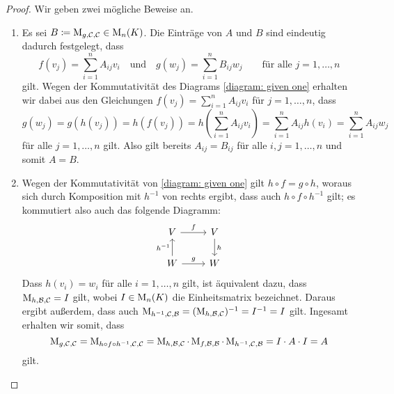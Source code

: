 \begin{proof}
  Wir geben zwei mögliche Beweise an.
  \begin{enumerate}
    \item
      Es sei $B \coloneqq \operatorname{M}_{g, \mathcal{C}, \mathcal{C}} \in \operatorname{M}_{n}(K)$.
      Die Einträge von $A$ und $B$ sind eindeutig dadurch festgelegt, dass
      \[
          f(v_j)
        = \sum_{i=1}^n A_{ij} v_i
        \quad\text{und}\quad
          g(w_j)
        = \sum_{i=1}^n B_{ij} w_j
        \qquad
        \text{für alle $j = 1, \dotsc, n$}
      \]
      gilt. Wegen der Kommutativität des Diagrams \eqref{diagram: given one} erhalten wir dabei aus den Gleichungen $f(v_j) = \sum_{i=1}^n A_{ij} v_i$ für $j = 1, \dotsc, n$, dass
      \[
          g( w_j )
        = g( h(v_j) )
        = h( f(v_j) )
        = h\left( \sum_{i=1}^n A_{ij} v_i \right)
        = \sum_{i=1}^n A_{ij} h(v_i)
        = \sum_{i=1}^n A_{ij} w_j
      \]
      für alle $j = 1, \dotsc, n$ gilt.
      Also gilt bereits $A_{ij} = B_{ij}$ für alle $i,j = 1, \dotsc, n$ und somit $A = B$.
    \item
      Wegen der Kommutativität von \eqref{diagram: given one} gilt $h \circ f = g \circ h$, woraus sich durch Komposition mit $h^{-1}$ von rechts ergibt, dass auch $h \circ f \circ h^{-1}$ gilt;
      es kommutiert also auch das folgende Diagramm:
      \begin{equation}
        \begin{tikzcd}
            V
            \arrow{r}{f}
          & V
            \arrow{d}{h}
          \\
            W
            \arrow{u}{h^{-1}}
            \arrow{r}{g}
          & W
        \end{tikzcd}
      \end{equation}
      Dass $h(v_i) = w_i$ für alle $i = 1, \dotsc, n$ gilt, ist äquivalent dazu, dass $\operatorname{M}_{h, \mathcal{B}, \mathcal{C}} = I$ gilt, wobei $I \in \operatorname{M}_{n}(K)$ die Einheitsmatrix bezeichnet.
      Daraus ergibt außerdem, dass auch $\operatorname{M}_{h^{-1}, \mathcal{C}, \mathcal{B}} = (\operatorname{M}_{h, \mathcal{B}, \mathcal{C}})^{-1} = I^{-1} = I$ gilt.
      Ingesamt erhalten wir somit, dass
      \[
          \operatorname{M}_{g, \mathcal{C}, \mathcal{C}}
        = \operatorname{M}_{h \circ f \circ h^{-1}, \mathcal{C}, \mathcal{C}}
        =       \operatorname{M}_{h, \mathcal{B}, \mathcal{C}}
          \cdot \operatorname{M}_{f, \mathcal{B}, \mathcal{B}}
          \cdot \operatorname{M}_{h^{-1}, \mathcal{C}, \mathcal{B}}
        = I \cdot A \cdot I
        = A
      \]
      gilt.
    \qedhere
  \end{enumerate}
\end{proof}

